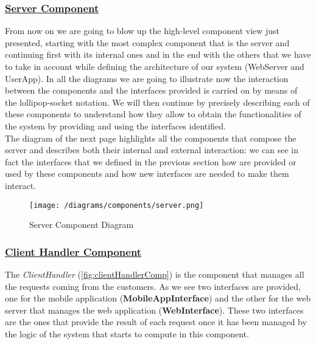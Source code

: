 		\subsubsection[Server Component]{\hyperlink{toc}{Server Component}}
			\label{sec:serverComponent}
			
			From now on we are going to blow up the high-level component view just presented, starting with the most complex component that is the server and continuing first with its internal ones and in the end with the others that we have to take in account while defining the architecture of our system (WebServer and UserApp). In all the diagrams we are going to illustrate now the interaction between the components and the interfaces provided is carried on by means of the lollipop-socket notation. We will then continue by precisely describing each of these components to understand how they allow to obtain the functionalities of the system by providing and using the interfaces identified.\\
			
			The diagram of the next page highlights all the components that compose the server and describes both their internal and external interaction: we can see in fact the interfaces that we defined in the previous section how are provided or used by these components and how new interfaces are needed to make them interact.
			
			\begin{figure}[hbtp]
				\centering
				\texttt{[image: /diagrams/components/server.png]}
				\caption{\label{fig:serverComp} Server Component Diagram}
			\end{figure} 
		
		\subsubsection[Client Handler Component]{\hyperlink{toc}{Client Handler Component}}
			\label{sec:clientHandlerComponent}
			
			The \emph{ClientHandler} (\autoref{fig:clientHandlerComp}) is the component that manages all the requests coming from the customers. As we see two interfaces are provided, one for the mobile application (\textbf{MobileAppInterface}) and the other for the web server that manages the web application (\textbf{WebInterface}). These two interfaces are the ones that provide the result of each request once it has been managed by the logic of the system that starts to compute in this component.
			

